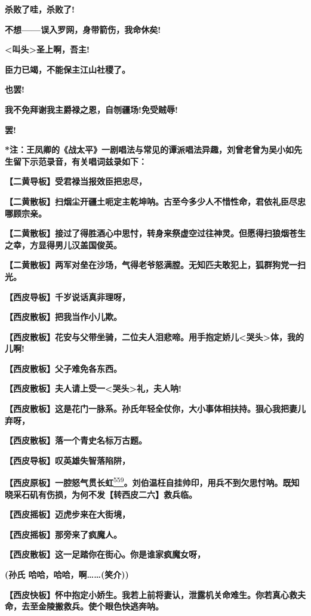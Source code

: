\textbf{杀败了哇，杀败了!}

\textbf{不想------误入罗网，身带箭伤，我命休矣!}

\textbf{\textless{}叫头\textgreater{}圣上啊，吾主!}

\textbf{臣力已竭，不能保主江山社稷了。}

\textbf{也罢!}

\textbf{我不免拜谢我主爵禄之恩，自刎疆场!免受贼辱!}

\textbf{罢!}

\textbf{*注：王凤卿的《战太平》一剧唱法与常见的谭派唱法异趣，刘曾老曾为吴小如先生留下示范录音，有关唱词兹录如下：}

\textbf{【二黄导板】受君禄当报效臣把忠尽，}

\textbf{【二黄散板】扫烟尘开疆土呃定主乾坤呐。古至今多少人不惜性命，君依礼臣尽忠哪顾宗亲。}

\textbf{【二黄散板】接过了得胜酒心中思忖，转身来祭虚空过往神灵。但愿得扫狼烟苍生之幸，方显得男儿汉盖国俊英。}

\textbf{【二黄散板】两军对垒在沙场，气得老爷怒满膛。无知匹夫敢犯上，狐群狗党一扫光。}

\textbf{【西皮导板】千岁说话真非理呀，}

\textbf{【西皮散板】把我当作小儿欺。}

\textbf{【西皮散板】花安与父带坐骑，二位夫人泪悲啼。用手抱定娇儿\textless{}哭头\textgreater{}体，我的儿啊!}

\textbf{【西皮散板】父子难免各东西。}

\textbf{【西皮散板】夫人请上受一\textless{}哭头\textgreater{}礼，夫人呐!}

\textbf{【西皮散板】这是花门一脉系。孙氏年轻全仗你，大小事体相扶持。狠心我把妻儿弃呀，}

\textbf{【西皮散板】落一个青史名标万古题。}

\textbf{【西皮导板】叹英雄失智落陷阱，}

\textbf{【西皮原板】一腔怒气贯长虹}\protect\hyperlink{fn559}{\textsuperscript{559}}\textbf{。刘伯温枉自挂帅印，用兵不到欠思忖呐。既知晓采石矶有伤损，为何不发【转西皮二六】救兵临。}

\textbf{【西皮摇板】迈虎步来在大街境，}

\textbf{【西皮摇板】那旁来了疯魔人。}

\textbf{【西皮散板】这一足踏你在街心。你是谁家疯魔女呀，}

\textbf{(孙氏 哈哈，哈哈，啊\ldots{}\ldots{}(笑介))}

\textbf{【西皮快板】怀中抱定小娇生。我若上前将妻认，泄露机关命难生。你若真心救夫命，去至金陵搬救兵。使个眼色快逃奔呐。}

